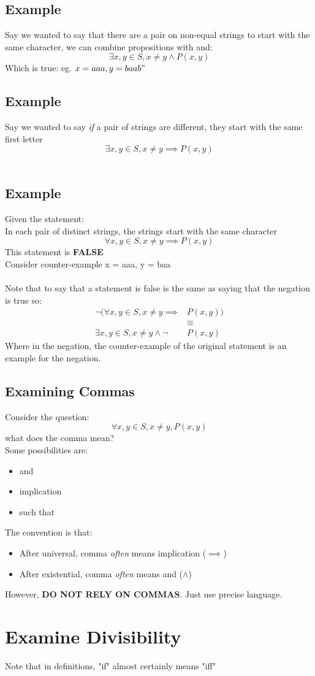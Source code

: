 \documentclass[12pt, letterpaper, twoside]{article}
\begin{document}
\subsection{Example}
Say we wanted to say that there are a pair on non-equal strings to start with the same character, we can combine propositions with and:
$$
\exists x, y \in S, x \neq y \land P(x, y)
$$
Which is true: eg. $x = aaa, y = baab"$
\\
\subsection{Example}
Say we wanted to say \textit{if} a pair of strings are different, they start with the same first letter
$$
\exists x, y \in S, x \neq y \implies P(x, y)
$$
\\
\subsection{Example}
Given the statement:\\
\hspace*{10mm} In each pair of distinct strings, the strings start with the same character
$$
\forall x, y \in S, x \neq y \implies P(x, y)
$$
This statement is \textbf{FALSE}\\
\hspace*{10mm} Consider counter-example x = aaa, y = baa\\
\\
Note that to say that a statement is false is the same as saying that the negation is true so:
\begin{align*}
	\lnot \big(\forall x, y \in S, x \neq y \implies &P(x, y)\big)\\
	&\equiv\\
	\exists x, y \in S, x \neq y \land \lnot &P(x, y)
\end{align*}
Where in the negation, the counter-example of the original statement is an example for the negation.

\subsection{Examining Commas}
Consider the question:
$$
\forall x, y \in S, x \neq y, P(x, y)
$$
what does the comma mean?\\
Some possibilities are:
\begin{itemize}
	\item and
	\item implication
	\item such that
\end{itemize}
The convention is that:
\begin{itemize}
	\item After universal, comma \textit{often} means implication ($\implies$)
	\item After existential, comma \textit{often} means and ($\land$)
\end{itemize}
However, \textbf{DO NOT RELY ON COMMAS}. Just use precise language.
\section{Examine Divisibility}
Note that in definitions, "if" almost certainly means "iff"
\end{document}
